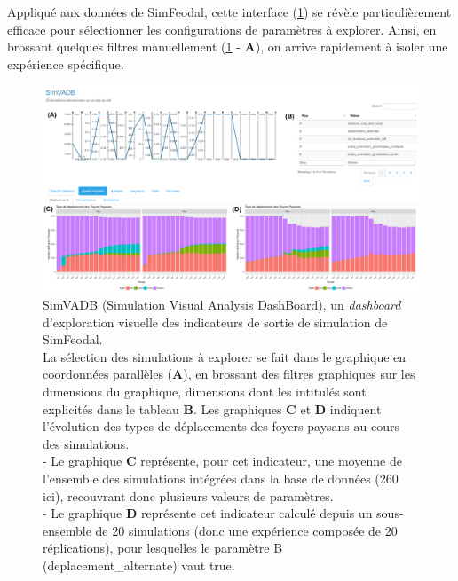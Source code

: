 Appliqué aux données de SimFeodal, cette interface (\cref{fig:simvadb_dashboard}) se révèle particulièrement efficace pour sélectionner les configurations de paramètres à explorer.
Ainsi, en \og brossant \fg{} quelques filtres manuellement (\cref{fig:simvadb_dashboard} - \textbf{A}), on arrive rapidement à isoler une expérience spécifique.

\begin{figure}[H]
	\captionsetup{width=\linewidth}
	\includegraphics[width=\linewidth]{img/SimVADB_Dashboard2_annote_retouche.png}
	\caption{SimVADB (Simulation Visual Analysis DashBoard), un \textit{dashboard} d'exploration visuelle des indicateurs de sortie de simulation de SimFeodal.\\
		La sélection des simulations à explorer se fait dans le graphique en coordonnées parallèles (\textbf{A}), en \og brossant\fg{} des filtres graphiques sur les \og dimensions\fg{} du graphique, dimensions dont les intitulés sont explicités dans le tableau \textbf{B}.
		Les graphiques \textbf{C} et \textbf{D} indiquent l'évolution des types de déplacements des foyers paysans au cours des simulations.\\
		- Le graphique \textbf{C} représente, pour cet indicateur, une moyenne de l'ensemble des simulations intégrées dans la base de données (260 ici), recouvrant donc plusieurs valeurs de paramètres.\\
		- Le graphique \textbf{D} représente cet indicateur calculé depuis un sous-ensemble de 20 simulations (donc une expérience composée de 20 réplications), pour lesquelles le paramètre \og \textsf{B} \fg{} (\textsf{deplacement\_alternate}) vaut \textsf{true}.}
	\label{fig:simvadb_dashboard}
\end{figure}

